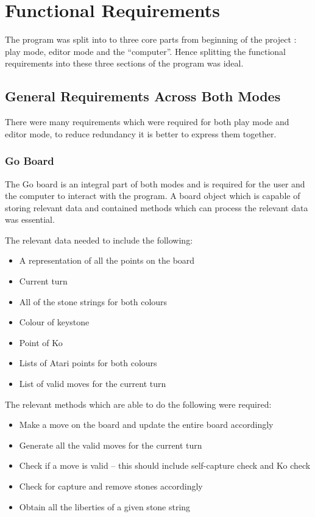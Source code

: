\documentclass{l4proj}
\begin{document}
\section{Functional Requirements}

The program was split into to three core parts from beginning of the project : play mode, editor mode and the “computer”. Hence splitting the functional requirements into these three sections of the program was ideal.

\subsection{General Requirements Across Both Modes}
There were many requirements which were required for both play mode and editor mode, to reduce redundancy it is better to express them together.

\subsubsection{Go Board}
The Go board is an integral part of both modes and is required for the user and the computer to interact with the program. A board object which is capable of storing relevant data and contained methods which can process the relevant data was essential.

The relevant data needed to include the following:
\begin{itemize}
\item A representation of all the points on the board
\item Current turn
\item All of the stone strings for both colours
\item Colour of keystone
\item Point of Ko
\item Lists of Atari points for both colours
\item List of valid moves for the current turn
\end{itemize}

The relevant methods which are able to do the following were required:
\begin{itemize}
\item Make a move on the board and update the entire board accordingly
\item Generate all the valid moves for the current turn
\item Check if a move is valid – this should include self-capture check and Ko check
\item Check for capture and remove stones accordingly
\item Obtain all the liberties of a given stone string
\end{itemize}
\end{document}
